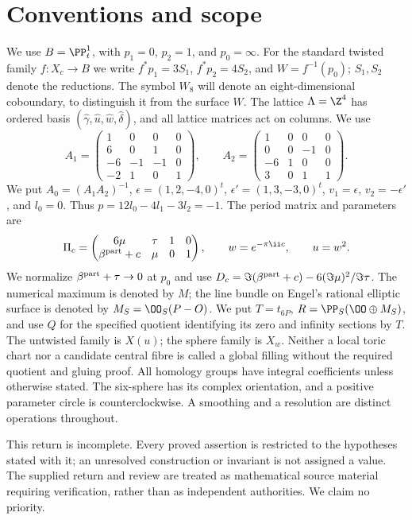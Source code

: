 \section*{Conventions and scope}
We use $B=\PP^1_t$, with $p_1=0$, $p_2=1$, and $p_0=\infty$.
For the standard twisted family $f:X_c\to B$ we write
$f^*p_1=3S_1$, $f^*p_2=4S_2$, and $W=f^{-1}(p_0)$;
$S_1,S_2$ denote the reductions. The symbol $W_8$ will denote an
eight-dimensional coboundary, to distinguish it from the surface $W$.
The lattice $\Lambda=\Z^4$ has ordered basis
$(\widehat\gamma,\widehat u,\widehat w,\widehat\delta)$,
and all lattice matrices act on columns. We use
\[
 A_1=\begin{pmatrix}1&0&0&0\\6&0&1&0\\-6&-1&-1&0\\-2&1&0&1\end{pmatrix},\qquad
 A_2=\begin{pmatrix}1&0&0&0\\0&0&-1&0\\-6&1&0&0\\3&0&1&1\end{pmatrix}.
\]
We put $A_0=(A_1A_2)^{-1}$,
$\epsilon=(1,2,-4,0)^t$, $\epsilon'=(1,3,-3,0)^t$,
$v_1=\epsilon$, $v_2=-\epsilon'$, and $l_0=0$.
Thus $p=12l_0-4l_1-3l_2=-1$.
The period matrix and parameters are
\[
 \Pi_c=\begin{pmatrix}6\mu&\tau&1&0\\\beta^{\rm part}+c&\mu&0&1\end{pmatrix},
 \qquad w=e^{-\pi\ii c},\qquad u=w^2.
\]
We normalize $\beta^{\rm part}+\tau\to0$ at $p_0$ and use
$D_c=\Im(\beta^{\rm part}+c)-6(\Im\mu)^2/\Im\tau$.
The numerical maximum is denoted by $M$; the line bundle on Engel's
rational elliptic surface is denoted by $M_S=\OO_S(P-O)$.
We put $T=t_{6P}$, $R=\PP_S(\OO\oplus M_S)$, and use $Q$ for the
specified quotient identifying its zero and infinity sections by $T$.
The untwisted family is $X(u)$; the sphere family is $X_w$.
Neither a local toric chart nor a candidate central fibre is called a
global filling without the required quotient and gluing proof.
All homology groups have integral coefficients unless otherwise stated.
The six-sphere has its complex orientation, and a positive parameter
circle is counterclockwise. A smoothing and a resolution are distinct
operations throughout.

This return is incomplete. Every proved assertion is restricted to the
hypotheses stated with it; an unresolved construction or invariant is not
assigned a value. The supplied return and review are treated as
mathematical source material requiring verification, rather than as
independent authorities. We claim no priority.

